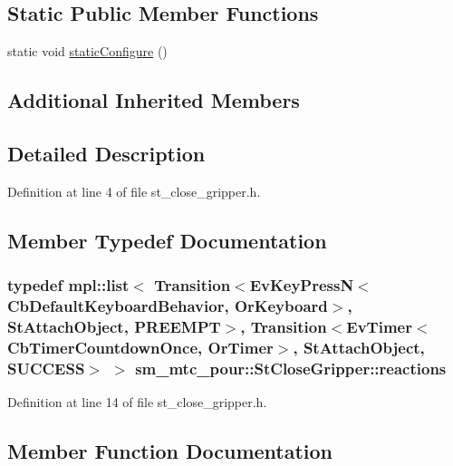\subsection*{Static Public Member Functions}
\begin{DoxyCompactItemize}
\item 
static void \hyperlink{structsm__mtc__pour_1_1StCloseGripper_a45b9d49ff76f15944f09efbf00739390}{static\+Configure} ()
\end{DoxyCompactItemize}
\subsection*{Additional Inherited Members}


\subsection{Detailed Description}


Definition at line 4 of file st\+\_\+close\+\_\+gripper.\+h.



\subsection{Member Typedef Documentation}
\subsubsection[{\texorpdfstring{reactions}{reactions}}]{\setlength{\rightskip}{0pt plus 5cm}typedef mpl\+::list$<$ Transition$<$Ev\+Key\+PressN$<$Cb\+Default\+Keyboard\+Behavior, {\bf Or\+Keyboard}$>$, {\bf St\+Attach\+Object}, {\bf P\+R\+E\+E\+M\+PT}$>$, Transition$<$Ev\+Timer$<$Cb\+Timer\+Countdown\+Once, {\bf Or\+Timer}$>$, {\bf St\+Attach\+Object}, {\bf S\+U\+C\+C\+E\+SS}$>$ $>$ {\bf sm\+\_\+mtc\+\_\+pour\+::\+St\+Close\+Gripper\+::reactions}}\hypertarget{structsm__mtc__pour_1_1StCloseGripper_a4e8a2396e13faa3e84127f21b6d04a83}{}\label{structsm__mtc__pour_1_1StCloseGripper_a4e8a2396e13faa3e84127f21b6d04a83}


Definition at line 14 of file st\+\_\+close\+\_\+gripper.\+h.



\subsection{Member Function Documentation}
